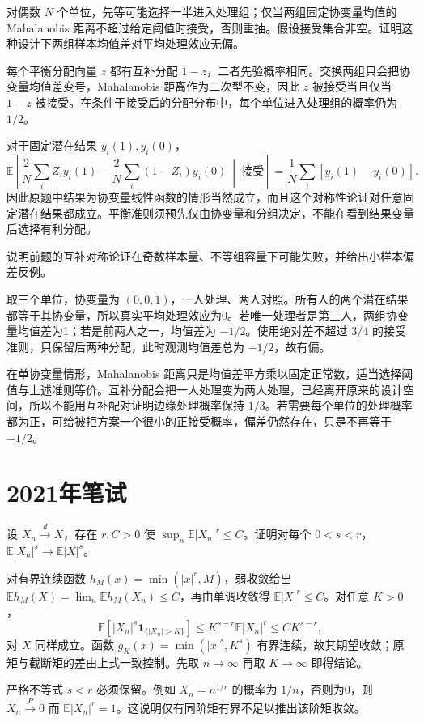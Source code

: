 \documentclass[UTF8,12pt,a4paper,fontset=fandol]{ctexbook}
\newcommand{\E}{\mathbb E}
\begin{document}
\begin{example}[原题5：平衡分组再随机化的无偏性]\label{yau:2020-5}
对偶数 $N$ 个单位，先等可能选择一半进入处理组；仅当两组固定协变量均值的 Mahalanobis 距离不超过给定阈值时接受，否则重抽。假设接受集合非空。证明这种设计下两组样本均值差对平均处理效应无偏。
\end{example}
\begin{solve}
每个平衡分配向量 $z$ 都有互补分配 $1-z$，二者先验概率相同。交换两组只会把协变量均值差变号，Mahalanobis 距离作为二次型不变，因此 $z$ 被接受当且仅当 $1-z$ 被接受。在条件于接受后的分配分布中，每个单位进入处理组的概率仍为 $1/2$。

对于固定潜在结果 $y_i(1),y_i(0)$，
\[
\E\left[\frac2N\sum_iZ_iy_i(1)-\frac2N\sum_i(1-Z_i)y_i(0)\ \middle|\ \text{接受}\right]
=\frac1N\sum_i[y_i(1)-y_i(0)].
\]
因此原题中结果为协变量线性函数的情形当然成立，而且这个对称性论证对任意固定潜在结果都成立。平衡准则须预先仅由协变量和分组决定，不能在看到结果变量后选择有利分配。
\end{solve}

\begin{example}[原题6：不等大小组的反例]\label{yau:2020-6}
说明前题的互补对称论证在奇数样本量、不等组容量下可能失败，并给出小样本偏差反例。
\end{example}
\begin{solve}
取三个单位，协变量为 $(0,0,1)$，一人处理、两人对照。所有人的两个潜在结果都等于其协变量，所以真实平均处理效应为0。若唯一处理者是第三人，两组协变量均值差为1；若是前两人之一，均值差为 $-1/2$。使用绝对差不超过 $3/4$ 的接受准则，只保留后两种分配，此时观测均值差总为 $-1/2$，故有偏。

在单协变量情形，Mahalanobis 距离只是均值差平方乘以固定正常数，适当选择阈值与上述准则等价。互补分配会把一人处理变为两人处理，已经离开原来的设计空间，所以不能用互补配对证明边缘处理概率保持 $1/3$。若需要每个单位的处理概率都为正，可给被拒方案一个很小的正接受概率，偏差仍然存在，只是不再等于 $-1/2$。
\end{solve}

\section{2021年笔试}
\begin{example}[原题1：弱收敛与较低阶矩收敛]\label{yau:2021-1}
设 $X_n\xrightarrow dX$，存在 $r,C>0$ 使 $\sup_n\E|X_n|^r\le C$。证明对每个 $0<s<r$，$\E|X_n|^s\to\E|X|^s$。
\end{example}
\begin{solve}
对有界连续函数 $h_M(x)=\min(|x|^r,M)$，弱收敛给出 $\E h_M(X)=\lim_n\E h_M(X_n)\le C$，再由单调收敛得 $\E|X|^r\le C$。对任意 $K>0$，
\[
\E[|X_n|^s\mathbf1_{\{|X_n|>K\}}]\le K^{s-r}\E|X_n|^r\le CK^{s-r},
\]
对 $X$ 同样成立。函数 $g_K(x)=\min(|x|^s,K^s)$ 有界连续，故其期望收敛；原矩与截断矩的差由上式一致控制。先取 $n\to\infty$ 再取 $K\to\infty$ 即得结论。

严格不等式 $s<r$ 必须保留。例如 $X_n=n^{1/r}$ 的概率为 $1/n$，否则为0，则 $X_n\xrightarrow P0$ 而 $\E|X_n|^r=1$。这说明仅有同阶矩有界不足以推出该阶矩收敛。
\end{solve}
\end{document}
